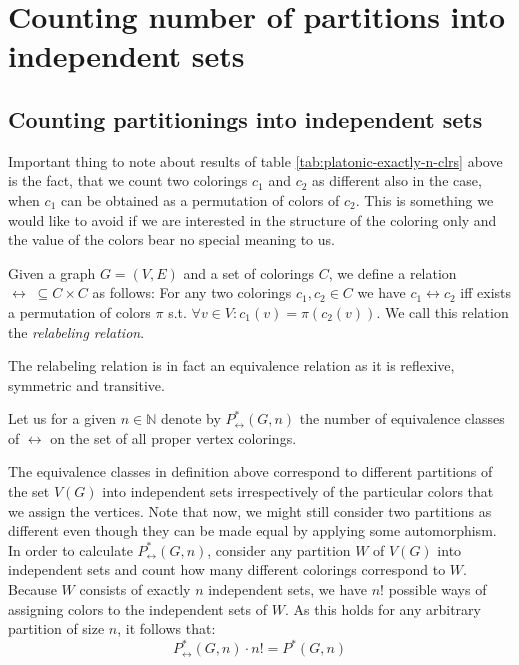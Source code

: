 \chapter{Counting number of partitions into independent sets}
\label{chap:num-partitions-into-indep-sets}

\begin{highlight}




\section{Counting partitionings into independent sets}

Important thing to note about results of table \ref{tab:platonic-exactly-n-clrs} above is the fact, that we count two colorings $c_1$ and $c_2$ as different also in the case, when $c_1$ can be obtained as a permutation of colors of $c_2$. This is something we would like to avoid if we are interested in the structure of the coloring only and the value of the colors bear no special meaning to us. 

\begin{defn}
    Given a graph $G=(V,E)$ and a set of colorings $C$, we define a relation $\leftrightarrow \; \subseteq C \times C$ as follows: For any two colorings $c_1,c_2 \in C$ we have $c_1 \leftrightarrow c_2$ iff exists a permutation of colors $\pi$ s.t. $\forall v \in V : c_1(v) = \pi(c_2(v))$. We call this relation the \emph{relabeling relation}.
\end{defn}

The relabeling relation is in fact an equivalence relation as it is reflexive, symmetric and transitive.

\begin{defn}
    Let us for a given $n \in \mathbb{N}$ denote by $P^*_{\leftrightarrow}(G,n)$ the number of equivalence classes of $\leftrightarrow$ on the set of all proper vertex colorings. 
\end{defn}

The equivalence classes in definition above correspond to different partitions of the set $V(G)$ into independent sets irrespectively of the particular colors that we assign the vertices. Note that now, we might still consider two partitions as different even though they can be made equal by applying some automorphism. In order to calculate $P^*_{\leftrightarrow}(G,n)$, consider any partition $W$ of $V(G)$ into independent sets and count how many different colorings correspond to $W$. Because $W$ consists of exactly $n$ independent sets, we have $n!$ possible ways of assigning colors to the independent sets of $W$. As this holds for any arbitrary partition of size $n$, it follows that:
\begin{equation}\label{eqn:count-relabel-orbits}
    P^*_{\leftrightarrow}(G,n) \cdot n! = P^*(G,n)
\end{equation}


\end{highlight}
